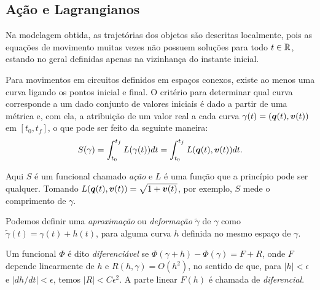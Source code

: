 \subsection{Ação e Lagrangianos}
Na modelagem obtida, as trajetórias dos objetos são descritas localmente, pois as equações de movimento muitas vezes não possuem soluções para todo $t \in \mathbb{R}$, estando no geral definidas apenas na vizinhança do instante inicial.

Para movimentos em circuitos definidos em espaços conexos, existe ao menos uma curva ligando os pontos inicial e final. O critério para determinar qual curva corresponde a um dado conjunto de valores iniciais é dado a partir de uma métrica e, com ela, a atribuição de um valor real a cada curva $\gamma(t) = (\bm q(t), \bm v(t))$ em $[t_0,t_f]$, o que pode ser feito da seguinte maneira:
\begin{equation}
    S(\gamma) = \int_{t_0}^{t_f} L(\gamma(t)) dt = \int_{t_0}^{t_f} L(\bm q(t), \bm v(t)) dt.
\end{equation}

Aqui $S$ é um funcional chamado \textit{ação} e $L$ é uma função que a princípio pode ser qualquer. Tomando $L(\bm q(t), \bm v(t)) = \sqrt{1 + \bm v(t)}$, por exemplo, $S$ mede o comprimento de $\gamma$.

Podemos definir uma \textit{aproximação} ou \textit{deformação} $\tilde \gamma$ de $\gamma$ como $\tilde \gamma (t) = \gamma(t) + h(t)$, para alguma curva $h$ definida no mesmo espaço de $\gamma$.

\begin{definition}
    Um funcional $\Phi$ é dito \textit{diferenciável} se $\Phi(\gamma + h) - \Phi(\gamma) = F + R$, onde $F$ depende linearmente de $h$ e $R(h, \gamma) = O(h^2)$, no sentido de que, para $|h| < \epsilon$ e $|dh/dt| < \epsilon$, temos $|R| < C \epsilon^2$. A parte linear $F(h)$ é chamada de \textit{diferencial}.
\end{definition}

